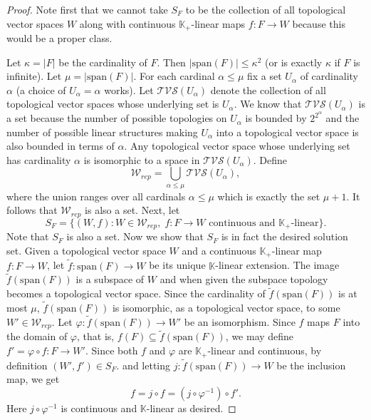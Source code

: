 \documentclass[a4paper,11pt]{article}
\numberwithin{equation}{section}
\theoremstyle{definition}
\theoremstyle{plain}
\newcommand{\spn}{\mathrm{span}}
\let\phi\varphi
\begin{document}
\begin{proof}
    Note first that we cannot take $S_{F}$ to be the collection of all topological vector spaces $W$ along with continuous $\mathbb{K}_{+}$-linear maps $f: F \longrightarrow W$ because this would be a proper class.
    
    Let $\kappa = |F|$ be the cardinality of $F$. Then $|\spn(F)| \leq \kappa^{2}$ (or is exactly $\kappa$ if $F$ is infinite). Let $\mu = |\spn(F)|$. For each cardinal $\alpha \leq \mu$ fix a set $U_{\alpha}$ of cardinality $\alpha$ (a choice of $U_{\alpha} = \alpha$ works). Let $\mathcal{TVS}(U_{\alpha})$ denote the collection of all topological vector spaces whose underlying set is $U_{\alpha}$. We know that $\mathcal{TVS}(U_{\alpha})$ is a set because the number of possible topologies on $U_{\alpha}$ is bounded by $2^{2^{\alpha}}$ and the number of possible linear structures making $U_{\alpha}$ into a topological vector space is also bounded in terms of $\alpha$. Any topological vector space whose underlying set has cardinality $\alpha$ is isomorphic to a space in $\mathcal{TVS}(U_{\alpha})$. Define
    $$\mathcal{W}_{rep} = \bigcup_{\alpha \leq \mu}\mathcal{TVS}(U_{\alpha}),$$
    where the union ranges over all cardinals $\alpha \leq \mu$ which is exactly the set $\mu + 1$. It follows that $\mathcal{W}_{rep}$ is also a set. Next, let
    $$S_{F} = \{(W, f): W \in \mathcal{W}_{rep},\; f: F \longrightarrow W \text{ continuous and } \mathbb{K}_{+}\text{-linear}\}.$$
    Note that $S_{F}$ is also a set. Now we show that $S_{F}$ is in fact the desired solution set. Given a topological vector space $W$ and a continuous $\mathbb{K}_{+}$-linear map $f: F \longrightarrow W$, let $\tilde{f}: \spn(F) \longrightarrow W$ be its unique $\mathbb{K}$-linear extension. The image $\tilde{f}(\spn(F))$ is a subspace of $W$ and when given the subspace topology becomes a topological vector space. Since the cardinality of $\tilde{f}(\spn(F))$ is at most $\mu$, $\tilde{f}(\spn(F))$ is isomorphic, as a topological vector space, to some $W' \in \mathcal{W}_{rep}$. Let $\phi: \tilde{f}(\spn(F)) \longrightarrow W'$ be an isomorphism. Since $f$ maps $F$ into the domain of $\phi$, that is, $f(F) \subseteq \tilde{f}(\spn(F))$, we may define $f' = \phi \circ f: F \longrightarrow W'$. Since both $f$ and $\phi$ are $\mathbb{K}_{+}$-linear and continuous, by definition $(W', f') \in S_{F}$. and letting $j: \tilde{f}(\spn(F)) \longrightarrow W$ be the inclusion map, we get 
    $$f = j \circ f = (j \circ \phi^{-1}) \circ f'.$$
    Here $j \circ \phi^{-1}$ is continuous and $\mathbb{K}$-linear as desired.
\end{proof}
\end{document}
